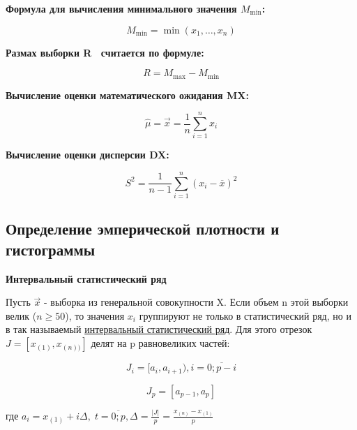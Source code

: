 \documentclass[12pt, a4paper]{report}
\begin{document}
	\textbf{Формула для вычисления минимального значения $M_{\min}$:}
	
	\begin{equation*} \label{Mmin}
	M_{\min} = \min{(x_1, \dots, x_n)}
	\end{equation*}
	
	\textbf{Размах выборки R  считается по формуле:}
	
	\begin{equation*} \label{R}
	R = M_{\max} - M_{\min}
	\end{equation*}
	
	\textbf{Вычисление оценки математического ожидания MX:}
	
	\begin{equation*}
	\hat{\mu} = \vec{x} = \frac{1}{n}\sum_{i=1}^{n} x_i
	\end{equation*}
	
	\textbf{Вычисление оценки дисперсии DX:}
	
	\begin{equation*}
	S^2 = \frac{1}{n-1} \sum_{i=1}^n (x_i - \overline{x})^2
	\end{equation*}
	
	\vspace{0.5cm}
	\subsection{Определение эмперической плотности и гистограммы}
	
	\hspace{0.5cm} \textbf{Интервальный статистический ряд}
	
	Пусть $\vec{x}$ - выборка из генеральной совокупности X. Если объем n этой выборки велик ($n\geq50$), то значения $x_i$ группируют не только в статистический ряд, но и в так называемый \underline{интервальный статистический ряд}. Для этого отрезок $J = [x_{(1)}, x_{(n))}]$ делят на p равновеликих частей:
	
	\begin{equation*}
	J_i = [a_i,a_{i+1}), i = \overline{0;p-i}
	\end{equation*}
	
	\begin{equation*}
	J_p = [a_{p-1},a_{p}]
	\end{equation*}
	
	\vspace{0.5cm}где $a_i = x_{(1)} + i\Delta,\; t = \overline{0;p}, \Delta = \frac{|J|}{p} = \frac{x_{(n)} - x_{(1)}}{p}$
	
\end{document}
